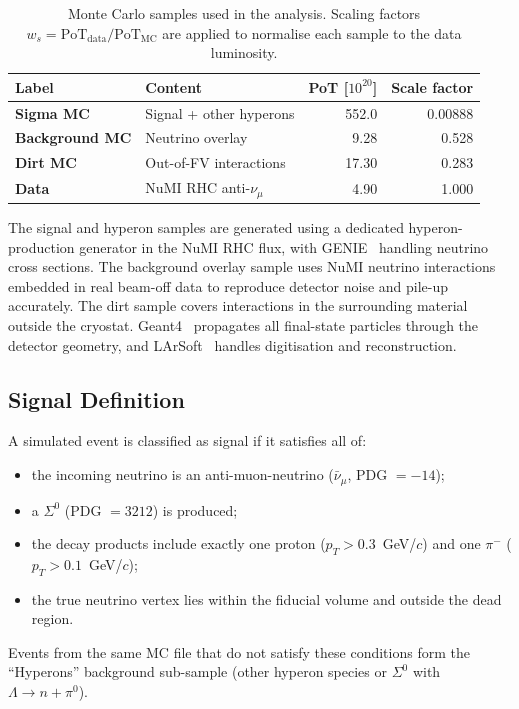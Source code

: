 \documentclass[12pt,a4paper]{article}
\begin{document}
\begin{table}[H]
  \centering
  \caption{Monte Carlo samples used in the analysis. Scaling factors
           $w_s = \text{PoT}_{\text{data}}/\text{PoT}_{\text{MC}}$ are
           applied to normalise each sample to the data luminosity.}
  \label{tab:samples}
  \begin{tabular}{llrr}
    \toprule
    Label & Content & PoT [$10^{20}$] & Scale factor \\
    \midrule
    \textbf{Sigma MC}      & Signal + other hyperons & 552.0 & 0.00888 \\
    \textbf{Background MC} & Neutrino overlay         &   9.28 & 0.528   \\
    \textbf{Dirt MC}       & Out-of-FV interactions   &  17.30 & 0.283   \\
    \textbf{Data}          & NuMI RHC anti-$\nu_\mu$  &   4.90 & 1.000   \\
    \bottomrule
  \end{tabular}
\end{table}

The signal and hyperon samples are generated using a dedicated
hyperon-production generator in the NuMI RHC flux, with GENIE~\cite{Andreopoulos:2009rq}
handling neutrino cross sections.  The background overlay sample
uses NuMI neutrino interactions embedded in real beam-off data to
reproduce detector noise and pile-up accurately.  The dirt sample
covers interactions in the surrounding material outside the cryostat.
Geant4~\cite{Agostinelli:2002hh} propagates all final-state particles
through the detector geometry, and LArSoft~\cite{Snider:2017wjd}
handles digitisation and reconstruction.

\subsection{Signal Definition}

A simulated event is classified as signal if it satisfies all of:
\begin{itemize}
  \item the incoming neutrino is an anti-muon-neutrino ($\bar\nu_\mu$, PDG $= -14$);
  \item a $\Sigma^0$ (PDG $= 3212$) is produced;
  \item the decay products include exactly one proton ($p_T > 0.3$~GeV/$c$)
        and one $\pi^-$ ($p_T > 0.1$~GeV/$c$);
  \item the true neutrino vertex lies within the fiducial volume and
        outside the dead region.
\end{itemize}
Events from the same MC file that do not satisfy these conditions form
the ``Hyperons'' background sub-sample (other hyperon species or
$\Sigma^0$ with $\Lambda \to n + \pi^0$).
\end{document}
